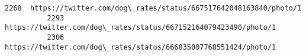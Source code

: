 \documentclass[11pt]{article}
\begin{document}
\begin{Verbatim}[commandchars=\\\{\}]
          2268  https://twitter.com/dog\_rates/status/667517642048163840/photo/1                                                                                                                                                                                                   
          2293  https://twitter.com/dog\_rates/status/667152164079423490/photo/1                                                                                                                                                                                                   
          2306  https://twitter.com/dog\_rates/status/666835007768551424/photo/1                                                                                                                                                                                                   
          

\end{Verbatim}
\end{document}

